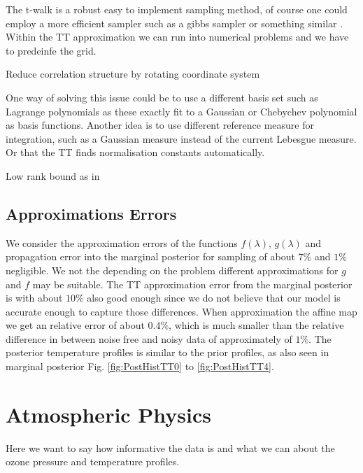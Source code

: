 The t-walk is a robust easy to implement sampling method, of course one could employ a more efficient sampler such as a gibbs sampler or something similar \cite{}.
Within the TT approximation we can run into numerical problems and we have to predeinfe the grid.

Reduce correlation structure by rotating coordinate system



One way of solving this issue could be to use a different basis set such as Lagrange polynomials as these exactly fit to a Gaussian or Chebychev polynomial as basis functions.
Another idea is to use different reference measure for integration, such as a Gaussian measure instead of the current Lebesgue measure.
Or that the TT finds normalisation constants automatically.


Low rank bound as in \cite{Rohrbach2022tterror}

\subsection{Approximations Errors}
We consider the approximation errors of the functions $f(\lambda)$, $g(\lambda)$ and propagation error into the marginal posterior for sampling of about $7\%$ and $1\%$ negligible.
We not the depending on the problem different approximations for $g$ and $f$ may be suitable.
The TT approximation error from the marginal posterior is with about $10\%$ also good enough since we do not believe that our model is accurate enough to capture those differences.
When approximation the affine map we get an relative error of about $0.4\%$, which is much smaller than the relative difference in between noise free and noisy data of approximately of $1 \%$.
The posterior temperature profiles is similar to the prior profiles, as also seen in marginal posterior Fig. \ref{fig:PostHistTT0} to \ref{fig:PostHistTT4}.


\section{Atmospheric Physics}
Here we want to say how informative the data is and what we can about the ozone pressure and temperature profiles.

